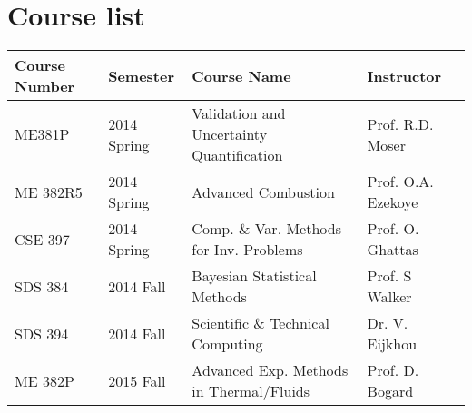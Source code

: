 \section{Course list}

\begin{table}[h]
\centering
\doublespacing
\begin{tabular}{llll}
\hline \hline
Course Number & Semester & Course Name & Instructor \\ 
\hline 
ME381P   & 2014 Spring   & Validation and Uncertainty Quantification &
	     Prof. R.D. Moser \\
ME 382R5 & 2014 Spring   & Advanced Combustion & Prof. O.A. Ezekoye \\
CSE 397  & 2014 Spring   &  Comp. \& Var. Methods for
	 Inv. Problems & Prof. O. Ghattas \\
SDS 384  & 2014 Fall   & Bayesian Statistical Methods & Prof. S
	     Walker \\
SDS 394  & 2014 Fall   & Scientific \& Technical Computing & Dr. V. Eijkhou \\
ME 382P  & 2015 Fall   & Advanced Exp. Methods in Thermal/Fluids
	 & Prof. D. Bogard \\  
\hline \hline
\end{tabular} 
\end{table}
